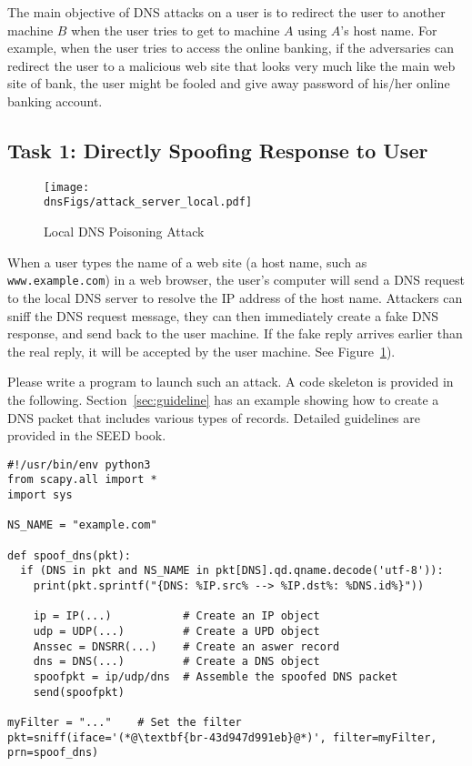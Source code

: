 The main objective of DNS attacks on a user is to redirect the user
to another machine $B$ when the user tries to get to machine $A$ using
$A$'s host name. For example, when the user tries to access the online banking,
if the adversaries can redirect the user 
to a malicious web site that looks very much like the main web site 
of bank, the user might be fooled and give away password
of his/her online banking account.





\subsection{Task 1: Directly Spoofing Response to User}



\begin{figure}[htb]
\centering
\texttt{[image: \\dnsFigs/attack\_server\_local.pdf]}
\caption{Local DNS Poisoning Attack}
\label{dns:fig:local_attack}
\end{figure}


When a user types the name of a web site (a host name, such as {\tt
www.example.com}) in a web browser, the user's computer will send a DNS 
request to the local DNS server to resolve the IP address of the host name.  
Attackers can sniff the DNS request message,
they can then immediately create a fake DNS response, 
and send back to the user machine. If the fake reply arrives
earlier than the real reply, it will be accepted by the user machine.
See Figure~\ref{dns:fig:local_attack}). 

Please write a program to launch such an attack. A code 
skeleton is provided in the following. Section~\ref{sec:guideline}
has an example showing how to create a DNS packet that includes 
various types of records. Detailed guidelines are 
provided in the SEED book. 


\begin{lstlisting}
#!/usr/bin/env python3
from scapy.all import *
import sys

NS_NAME = "example.com"

def spoof_dns(pkt):
  if (DNS in pkt and NS_NAME in pkt[DNS].qd.qname.decode('utf-8')):
    print(pkt.sprintf("{DNS: %IP.src% --> %IP.dst%: %DNS.id%}"))

    ip = IP(...)           # Create an IP object
    udp = UDP(...)         # Create a UPD object
    Anssec = DNSRR(...)    # Create an aswer record
    dns = DNS(...)         # Create a DNS object
    spoofpkt = ip/udp/dns  # Assemble the spoofed DNS packet
    send(spoofpkt)

myFilter = "..."    # Set the filter
pkt=sniff(iface='(*@\textbf{br-43d947d991eb}@*)', filter=myFilter, prn=spoof_dns)
\end{lstlisting}

